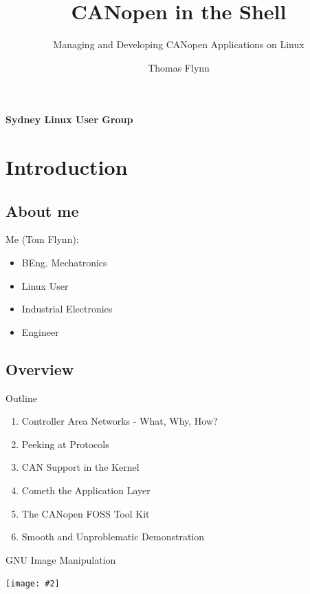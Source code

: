 \documentclass{beamer}
\title{CANopen in the Shell}
\subtitle{Managing and Developing CANopen Applications on Linux}
\author{Thomas Flynn}
\newcommand {\framedgraphic}[2] {
    \begin{frame}{#1}
        \begin{center}
            \texttt{[image: \#2]}
        \end{center}
    \end{frame}
}
\begin{document}
 

  \begin{frame}
    \framesubtitle{\textbf{S}ydney \textbf{L}inux \textbf{U}ser \textbf{Group}}
    
    \titlepage
  \end{frame}

  
\section*{Introduction}

\subsection*{About me}
\begin{frame}
    \huge{Me (Tom Flynn):}
    \begin{itemize}
      \item{BEng. Mechatronics}
      \item{Linux User}
      \item{Industrial Electronics}
      \item{Engineer}
    \end{itemize}
    \end{frame}
  
\subsection*{Overview}
  \begin{frame}{Outline}
    \begin{enumerate}
    \item{Controller Area Networks - What, Why, How?}
      \pause
    \item{Peeking at Protocols}
      \pause
    \item{CAN Support in the Kernel}
      \pause
    \item{Cometh the Application Layer}
      \pause
    \item{The CANopen FOSS Tool Kit}
      \pause
      \item{Smooth and Unproblematic Demonstration}
   \end{enumerate}        
\end{frame}
  
  \framedgraphic{GNU Image Manipulation}{./images/title_slide}
\end{document}
